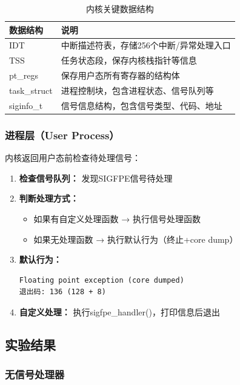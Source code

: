 \documentclass[UTF8,a4paper,12pt]{ctexart}
\begin{document}
\begin{table}[H]
\centering
\caption{内核关键数据结构}
\begin{tabular}{lp{8cm}}
\toprule
\textbf{数据结构} & \textbf{说明} \\
\midrule
IDT & 中断描述符表，存储256个中断/异常处理入口 \\
TSS & 任务状态段，保存内核栈指针等信息 \\
pt\_regs & 保存用户态所有寄存器的结构体 \\
task\_struct & 进程控制块，包含进程状态、信号队列等 \\
siginfo\_t & 信号信息结构，包含信号类型、代码、地址 \\
\bottomrule
\end{tabular}
\end{table}

\subsubsection{进程层（User Process）}

内核返回用户态前检查待处理信号：

\begin{enumerate}[leftmargin=2em]
    \item \textbf{检查信号队列：} 发现SIGFPE信号待处理
    \item \textbf{判断处理方式：}
    \begin{itemize}
        \item 如果有自定义处理函数 → 执行信号处理函数
        \item 如果无处理函数 → 执行默认行为（终止+core dump）
    \end{itemize}
    \item \textbf{默认行为：}
    \begin{lstlisting}[style=bashstyle]
Floating point exception (core dumped)
退出码: 136 (128 + 8)
    \end{lstlisting}
    \item \textbf{自定义处理：} 执行sigfpe\_handler()，打印信息后退出
\end{enumerate}

\subsection{实验结果}

\subsubsection{无信号处理器}
\end{document}
